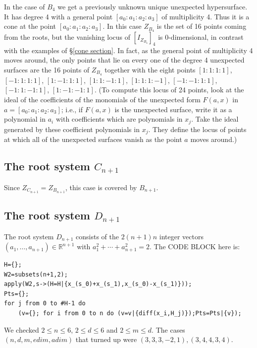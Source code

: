 \documentclass[12pt]{amsart}
\numberwithin{equation}{section}
\theoremstyle{definition}
\newcommand{\RR}{ \ensuremath{\mathbb{R}}}
\begin{document}
In the case of $B_4$ we get a previously unknown unique unexpected hypersurface. It has degree 4 with a general point $[a_0:a_1:a_2:a_3]$ of multiplicity 4.
Thus it is a cone at the point $[a_0:a_1:a_2:a_3]$. In this case $Z_{B_4}$ is the set of 16 points coming from the roots, but the vanishing locus of $[I_{Z_{B_4}}]_4$
is 0-dimensional, in contrast with the examples of \S \ref{cone section}. In fact, as the general point of multiplicity 4 moves around, the only points that lie on every
one of the degree 4 unexpected surfaces are the 16 points of $Z_{B_4}$ together with the eight points
$[1:1:1:1]$,
$[-1:1:1:1]$,
$[1:-1:1:1]$,
$[1:1:-1:1]$,
$[1:1:1:-1]$,
$[-1:-1:1:1]$,
$[-1:1:-1:1]$,
$[1:-1:-1:1]$.
(To compute this locus of 24 points, look at the ideal of the coefficients of the monomials of the unexpected form
$F(a,x)$ in $a=[a_0:a_1:a_2:a_3]$; i.e., if $F(a,x)$ is the unexpected surface,
write it as a polynomial in $a_i$ with coefficients which are polynomials in $x_j$. Take the ideal generated by these 
coefficient polynomials in $x_j$. They define the locus of points at which all of the unexpected surfaces vanish as the point
$a$ moves around.)

\subsection{The root system \texorpdfstring{$C_{n+1}$}{C(n+1)}}
Since $Z_{C_{n+1}}=Z_{B_{n+1}}$, this case is covered by $B_{n+1}$.

\subsection{The root system \texorpdfstring{$D_{n+1}$}{D(n+1)}}
The root system $D_{n+1}$ consists of the $2(n+1)n$ integer vectors $(a_1,\ldots,a_{n+1})\in\RR^{n+1}$ with $a_1^2+\cdots+a_{n+1}^2=2$.
The CODE BLOCK here is:
\begin{verbatim}
H={};
W2=subsets(n+1,2);
apply(W2,s->(H=H|{x_(s_0)+x_(s_1),x_(s_0)-x_(s_1)}));
Pts={};
for j from 0 to #H-1 do 
    (v={}; for i from 0 to n do (v=v|{diff(x_i,H_j)});Pts=Pts|{v});
\end{verbatim}
We checked $2\leq n\leq6$, $2\leq d\leq 6$ and $2\leq m\leq d$. The cases $({n, d, m, edim, adim})$ 
that turned up were $({3, 3, 3, -2, 1}), ({3, 4, 4, 3, 4})$.
\end{document}
